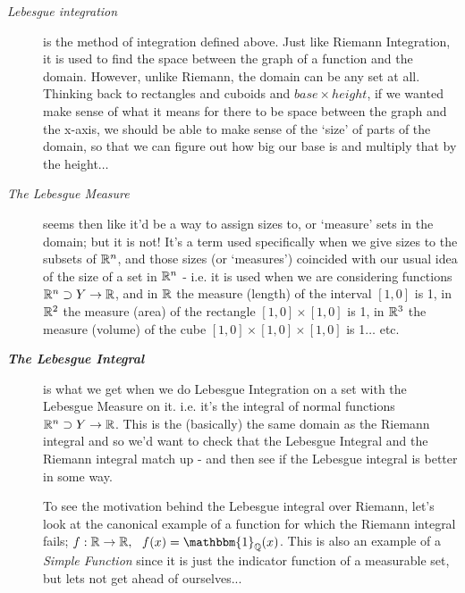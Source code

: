 \begin{description}
\item[\em Lebesgue integration\/] is the method of integration defined above. Just like Riemann Integration, it is used to find the space between the graph of a function and the domain. However, unlike Riemann, the domain can be any set at all. Thinking back to rectangles and cuboids and $base \times height$, if we wanted make sense of what it means for there to be space between the graph and the x-axis, we should be able to make sense of the `size' of parts of the domain, so that we can figure out how big our base is and multiply that by the height$\ldots$
%
\item[\em The Lebesgue Measure\/] seems then like it'd be a way to assign sizes to, or `measure' sets in the domain; but it is not! It's a term used specifically when we give sizes to the subsets of $\mathbb{R}^n$, and those sizes (or `measures') coincided with our usual idea of the size of a set in $\mathbb{R}^n$ - i.e. it is used when we are considering functions $\mathbb{R}^n \supset Y \rightarrow \mathbb{R}$, and in $\mathbb{R}$ the measure (length) of the interval $[1, 0]$ is 1, in $\mathbb{R}^2$ the measure (area) of the rectangle $[1, 0] \times [1, 0]$ is 1, in $\mathbb{R}^3$ the measure (volume) of the cube $[1, 0] \times [1, 0] \times [1, 0]$ is 1$\ldots$ etc. 
%
\item[\bf \em The Lebesgue Integral\/] is what we get when we do Lebesgue Integration on a set with the Lebesgue Measure on it. i.e. it's the integral of normal functions $\mathbb{R}^n \supset Y \rightarrow \mathbb{R}$. This is the (basically) the same domain as the Riemann integral and so we'd want to check that the Lebesgue Integral and the Riemann integral match up - and then see if the Lebesgue integral is better in some way.

To see the motivation behind the Lebesgue integral over Riemann, let's look at the canonical example of a function for which the Riemann integral fails; $f:\R \rightarrow \R,\ \ f(x) = \mathbbm{1}_\Q(x)$. This is also an example of a {\em Simple Function} since it is just the indicator function of a measurable set, but lets not get ahead of ourselves...
\end{description}
